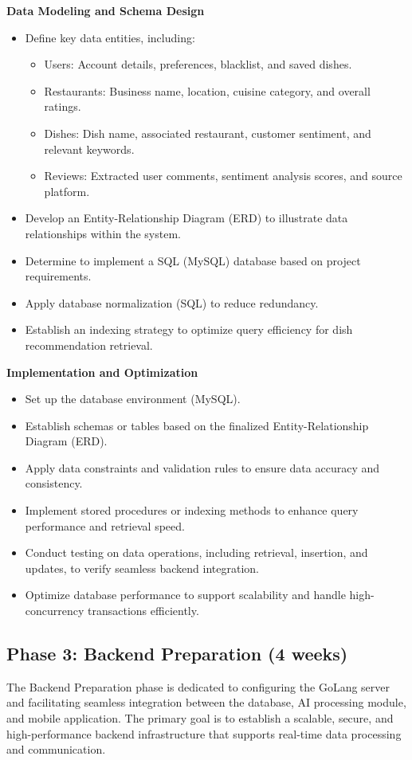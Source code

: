 \textbf{Data Modeling and Schema Design}
\begin{itemize}
\item Define key data entities, including:
	\begin{itemize}
	\item Users: Account details, preferences, blacklist, and saved dishes.
	\item Restaurants: Business name, location, cuisine category, and overall ratings.
	\item Dishes: Dish name, associated restaurant, customer sentiment, and relevant keywords.
	\item Reviews: Extracted user comments, sentiment analysis scores, and source platform.
	\end{itemize}
\item Develop an Entity-Relationship Diagram (ERD) to illustrate data relationships within the system.
\item Determine to implement a SQL (MySQL) database based on project requirements.
\item Apply database normalization (SQL) to reduce redundancy.
\item Establish an indexing strategy to optimize query efficiency for dish recommendation retrieval.
\end{itemize}

\textbf{Implementation and Optimization}
\begin{itemize}
\item Set up the database environment (MySQL).
\item Establish schemas or tables based on the finalized Entity-Relationship Diagram (ERD).
\item Apply data constraints and validation rules to ensure data accuracy and consistency.
\item Implement stored procedures or indexing methods to enhance query performance and retrieval speed.
\item Conduct testing on data operations, including retrieval, insertion, and updates, to verify seamless backend integration.
\item Optimize database performance to support scalability and handle high-concurrency transactions efficiently.
\end{itemize}

\subsection*{Phase 3: Backend Preparation (4 weeks)}
The Backend Preparation phase is dedicated to configuring the GoLang server and facilitating seamless integration between the database, AI processing module, and mobile application. The primary goal is to establish a scalable, secure, and high-performance backend infrastructure that supports real-time data processing and communication.

